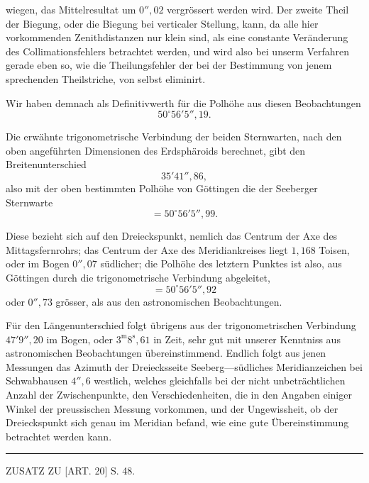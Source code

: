 \noindent wiegen, das Mittelresultat um \(0''{,}02\) vergrössert werden wird. Der zweite Theil
der Biegung, oder die Biegung bei verticaler Stellung, kann, da alle hier
vorkommenden Zenithdistanzen nur klein sind, als eine constante Veränderung
des Collimationsfehlers betrachtet werden, und wird also bei unserm Verfahren
gerade eben so, wie die Theilungsfehler der bei der Bestimmung von jenem
sprechenden Theilstriche, von selbst eliminirt.

Wir haben demnach als Definitivwerth für die Polhöhe aus diesen Beobachtungen
\[
50^\circ56'5''{,}19.
\]

Die erwähnte trigonometrische Verbindung der beiden Sternwarten, nach
den oben angeführten Dimensionen des Erdsphäroids berechnet, gibt den
Breitenunterschied
\[
35'41''{,}86,
\]
\noindent also mit der oben bestimmten Polhöhe von Göttingen die der Seeberger
Sternwarte
\[
=50^\circ56'5''{,}99.
\]

Diese bezieht sich auf den Dreieckspunkt, nemlich das Centrum der Axe
des Mittagsfernrohrs; das Centrum der Axe des Meridiankreises liegt \(1{,}168\)
Toisen, oder im Bogen \(0''{,}07\) südlicher; die Polhöhe des letztern Punktes ist
also, aus Göttingen durch die trigonometrische Verbindung abgeleitet,
\[
=50^\circ56'5''{,}92
\]
\noindent oder \(0''{,}73\) grösser, als aus den astronomischen Beobachtungen.

Für den Längenunterschied folgt übrigens aus der trigonometrischen
Verbindung \(47'9''{,}20\) im Bogen, oder \(3^{\mathrm m}8^{\mathrm s}{,}61\) in Zeit, sehr gut mit unserer
Kenntniss aus astronomischen Beobachtungen übereinstimmend. Endlich folgt aus
jenen Messungen das Azimuth der Dreiecksseite Seeberg---südliches
Meridianzeichen bei Schwabhausen \(4''{,}6\) westlich, welches gleichfalls bei der nicht
unbeträchtlichen Anzahl der Zwischenpunkte, den Verschiedenheiten, die in
den Angaben einiger Winkel der preussischen Messung vorkommen, und der
Ungewissheit, ob der Dreieckspunkt sich genau im Meridian befand, wie eine
gute Übereinstimmung betrachtet werden kann.

\begin{center}\rule{.24\textwidth}{.4pt}\end{center}

\par\clearpage

\vspace*{.055\textheight}
\begin{center}{\Large ZUSATZ ZU [ART. 20] S. 48.}\end{center}

